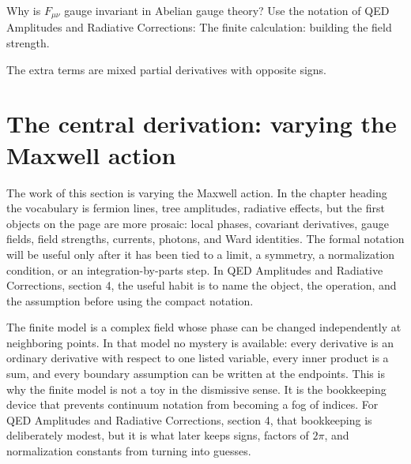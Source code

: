 \begin{exercise}
Why is \(F_{\mu\nu}\) gauge invariant in Abelian gauge theory?  Use the notation of QED Amplitudes and Radiative Corrections: The finite calculation: building the field strength.
\begin{answer}
The extra terms are mixed partial derivatives with opposite signs.
\end{answer}
\end{exercise}



\section{The central derivation: varying the Maxwell action}













The work of this section is varying the Maxwell action.  In the chapter heading the vocabulary is fermion lines, tree amplitudes, radiative effects, but the first objects on the page are more prosaic: local phases, covariant derivatives, gauge fields, field strengths, currents, photons, and Ward identities.  The formal notation will be useful only after it has been tied to a limit, a symmetry, a normalization condition, or an integration-by-parts step.  In QED Amplitudes and Radiative Corrections, section 4, the useful habit is to name the object, the operation, and the assumption before using the compact notation.

The finite model is a complex field whose phase can be changed independently at neighboring points.  In that model no mystery is available: every derivative is an ordinary derivative with respect to one listed variable, every inner product is a sum, and every boundary assumption can be written at the endpoints.  This is why the finite model is not a toy in the dismissive sense.  It is the bookkeeping device that prevents continuum notation from becoming a fog of indices.  For QED Amplitudes and Radiative Corrections, section 4, that bookkeeping is deliberately modest, but it is what later keeps signs, factors of \(2\pi\), and normalization constants from turning into guesses.

